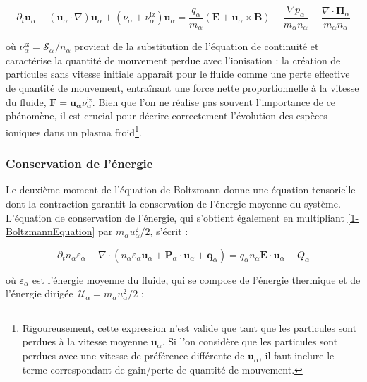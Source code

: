 \begin{refsection}
\begin{equation}
\label{1-eqMouvement}
\partial_t \mathbf{u}_\alpha + (\mathbf{u}_\alpha\cdot\nabla)\mathbf{u}_\alpha
+\left(\nu_\alpha+\nu_\alpha^\text{iz}\right) \mathbf
u_\alpha=\frac{q_\alpha}{m_\alpha}\left(\mathbf E+\mathbf u_\alpha\times \mathbf
B\right) -\frac{\nabla p_\alpha}{m_\alpha n_\alpha} -\frac{\nabla\cdot\boldsymbol{\Pi}_\alpha}{m_\alpha n_\alpha}
\end{equation}

où $\nu_\alpha^{\text{iz}}=\mathcal{S}^+_\alpha/n_\alpha$ provient de la
substitution de l'équation de continuité et caractérise la quantité de mouvement
perdue avec l'ionisation : la création de particules sans
vitesse initiale apparaît pour le fluide comme une perte effective de quantité
de mouvement, entraînant une force nette proportionnelle à la vitesse
du fluide, $\mathbf F=\mathbf{u_\alpha}
\nu_\alpha^{\text{iz}}$. Bien que l'on ne
réalise pas souvent l'importance de ce phénomène, il est crucial pour décrire
correctement l'évolution des espèces ioniques dans un plasma
froid\footnote{Rigoureusement, cette expression n'est valide que tant que les
particules sont perdues à la vitesse moyenne $\mathbf u_\alpha$.
Si l'on considère que les particules sont perdues avec une vitesse de
préférence différente de $\mathbf u_\alpha$, il faut inclure le terme
correspondant de gain/perte de quantité de mouvement.}.

\subsubsection{Conservation de l'énergie}
\label{1-ConservationEnergie}
Le deuxième moment de l'équation de Boltzmann donne une équation tensorielle
dont la contraction garantit la conservation de l'énergie moyenne du système.
L'équation de conservation de
l'énergie, qui s'obtient également en multipliant \eqref{1-BoltzmannEquation}
par $m_\alpha {u}_\alpha^2/2$, s'écrit :

\begin{equation}
\label{1-eqEnergie}
\partial_t n_\alpha\varepsilon_\alpha+
\nabla\cdot\left(n_\alpha\varepsilon_\alpha\mathbf{u}_\alpha+\mathbf
P_\alpha\cdot\mathbf{u}_\alpha + \mathbf q_\alpha\right) =q_\alpha
n_\alpha\mathbf E\cdot
\mathbf{u}_\alpha+{Q}_\alpha
\end{equation}

où $\varepsilon_\alpha$ est l'énergie
moyenne du fluide, qui se compose de l'énergie thermique et de l'énergie dirigée
$\,\mathcal{U}_{\alpha}=m_\alpha u_\alpha^2/2$ :


\end{refsection}
